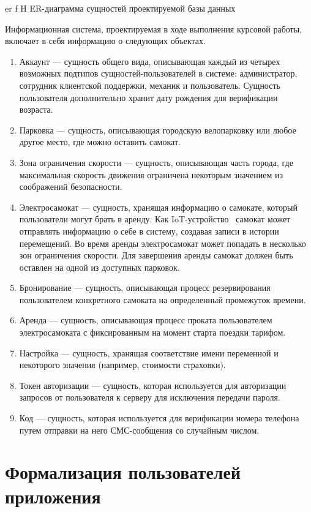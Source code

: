     {er}
    {f}
    {H}
    {\textwidth}
    {ER-диаграмма сущностей проектируемой базы данных}

Информационная система, проектируемая в ходе выполнения курсовой работы, включает в себя информацию о следующих объектах.

\begin{enumerate}
    \item Аккаунт --- сущность общего вида, описывающая каждый из четырех возможных подтипов сущностей-пользователей в системе: администратор, сотрудник клиентской поддержки, механик и пользователь. Сущность пользователя дополнительно хранит дату рождения для верификации возраста.
    \item Парковка --- сущность, описывающая городскую велопарковку или любое другое место, где можно оставить самокат.
    \item Зона ограничения скорости --- сущность, описывающая часть города, где максимальная скорость движения ограничена некоторым значением из соображений безопасности.
    \item Электросамокат --- сущность, хранящая информацию о самокате, который пользователи могут брать в аренду. Как IoT-устройство~\cite{iot} самокат может отправлять информацию о себе в систему, создавая записи в истории перемещений. Во время аренды электросамокат может попадать в несколько зон ограничения скорости. Для завершения аренды самокат должен быть оставлен на одной из доступных парковок.
    \item Бронирование --- сущность, описывающая процесс резервирования пользователем конкретного самоката на определенный промежуток времени.
    \item Аренда --- сущность, описывающая процесс проката пользователем электросамоката с фиксированным на момент старта поездки тарифом.
    \item Настройка --- сущность, хранящая соответствие имени переменной и некоторого значения (например, стоимости страховки).
    \item Токен авторизации --- сущность, которая используется для авторизации запросов от пользователя к серверу для исключения передачи пароля.
    \item Код --- сущность, которая используется для верификации номера телефона путем отправки на него СМС-сообщения со случайным числом.
\end{enumerate}

\section{Формализация пользователей приложения}

